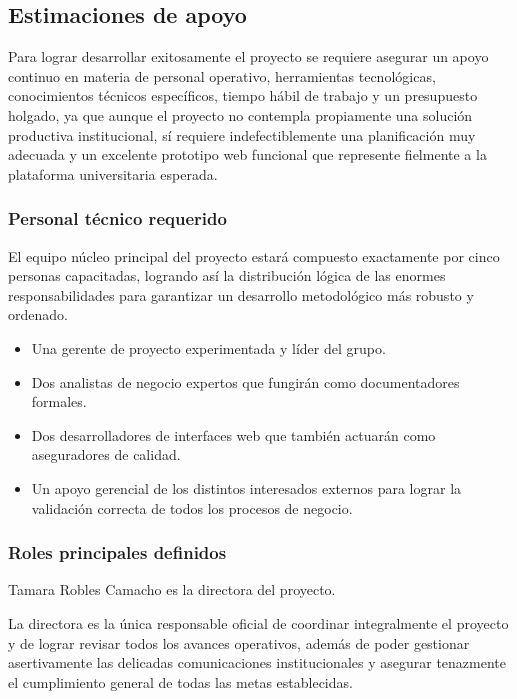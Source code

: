 \documentclass[11pt,spanish]{article}
\begin{document}
\subsection{Estimaciones de apoyo}

Para lograr desarrollar exitosamente el proyecto se requiere asegurar un apoyo continuo en materia de personal operativo, herramientas tecnológicas, conocimientos técnicos específicos, tiempo hábil de trabajo y un presupuesto holgado, ya que aunque el proyecto no contempla propiamente una solución productiva institucional, sí requiere indefectiblemente una planificación muy adecuada y un excelente prototipo web funcional que represente fielmente a la plataforma universitaria esperada.

\subsubsection{Personal técnico requerido}

El equipo núcleo principal del proyecto estará compuesto exactamente por cinco personas capacitadas, logrando así la distribución lógica de las enormes responsabilidades para garantizar un desarrollo metodológico más robusto y ordenado.

\begin{itemize}
    \item Una gerente de proyecto experimentada y líder del grupo.
    \item Dos analistas de negocio expertos que fungirán como documentadores formales.
    \item Dos desarrolladores de interfaces web que también actuarán como aseguradores de calidad.
    \item Un apoyo gerencial de los distintos interesados externos para lograr la validación correcta de todos los procesos de negocio.
\end{itemize}

\subsubsection{Roles principales definidos}

Tamara Robles Camacho es la directora del proyecto.

La directora es la única responsable oficial de coordinar integralmente el proyecto y de lograr revisar todos los avances operativos, además de poder gestionar asertivamente las delicadas comunicaciones institucionales y asegurar tenazmente el cumplimiento general de todas las metas establecidas.
\end{document}
